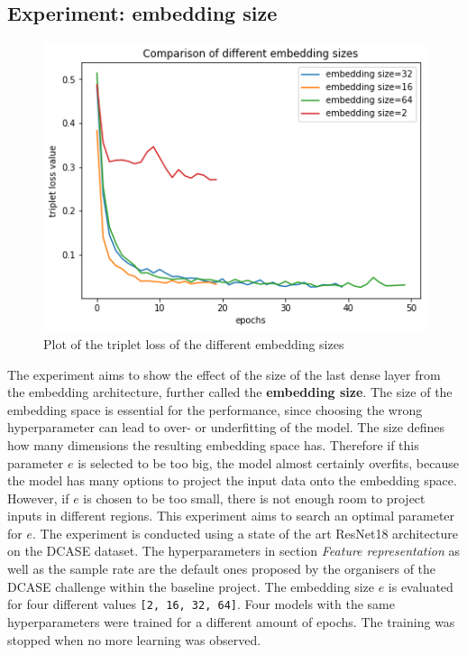 \subsection{Experiment: embedding size}
\label{sub:Experiment-Embedding-Size}
\begin{figure}[t]
\centering
    \includegraphics[width=0.5\linewidth]{study-doc/experiment_embedding_size/assets/plot_embedding_sizes.png}
    \caption{Plot of the triplet loss of the different embedding sizes}
    \label{fig:plot-embeddings-epochs}
\end{figure}
The experiment aims to show the effect of the size of the last dense layer from the embedding architecture, further called the \textbf{embedding size}. The size of the embedding space is essential for the performance, since choosing the wrong hyperparameter can lead to over- or underfitting of the model. The size defines how many dimensions the resulting embedding space has. Therefore if this parameter $e$ is selected to be too big, the model almost certainly overfits, because the model has many options to project the input data onto the embedding space. However, if $e$ is chosen to be too small, there is not enough room to project inputs in different regions. This experiment aims to search an optimal parameter for $e$.
\newline
\newline
The experiment is conducted using a state of the art ResNet18 architecture on the \gls{DCASE} dataset. The hyperparameters in section \textit{Feature representation} as well as the sample rate are the default ones proposed by the organisers of the \gls{DCASE} challenge within the baseline project. The embedding size $e$ is evaluated for four different values \texttt{[2, 16, 32, 64]}.
\newline
\newline
Four models with the same hyperparameters were trained for a different amount of epochs. The training was stopped when no more learning was observed. 
\newline
